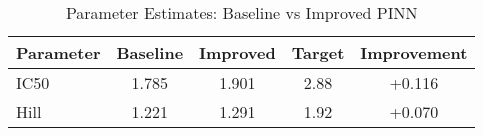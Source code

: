 \begin{table}
\caption{Parameter Estimates: Baseline vs Improved PINN}
\label{tab:parameter_comparison}
\begin{tabular}{lcccc}
\toprule
Parameter & Baseline & Improved & Target & Improvement \\
\midrule
IC50 & 1.785 & 1.901 & 2.88 & +0.116 \\
Hill & 1.221 & 1.291 & 1.92 & +0.070 \\
\bottomrule
\end{tabular}
\end{table}
